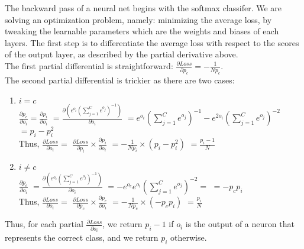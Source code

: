 The backward pass of a neural net begins with the softmax classifer.
We are solving an optimization problem, namely: minimizing the average loss,
by tweaking the learnable parameters which are the weights and biases of each layers.
The first step is to differentiate the average loss with respect to the scores of the output layer,
as described by the partial derivative above.\\
The first partial differential is straightforward: $\frac{\partial Loss}{\partial p_c} = -\frac{1}{Np_c}$.\\
The second partial differential is trickier as there are two cases:
\begin{enumerate}[topsep=-12pt]
  
 \item $i = c$\\
   $ \frac{\partial p_c}{\partial o_i} = \frac{\partial p_i}{\partial o_i} $
   $ = \frac{\partial( e^{o_i} (\sum_{j=1}^{C} e^{o_j})^{-1})} {\partial o_i} $
   $ = e^{o_i} (\sum_{j=1}^{C} e^{o_j})^{-1} - e^{2o_i} (\sum_{j=1}^{C} e^{o_j})^{-2} $
   $ = p_i - p_i^2$\\
   Thus, $\frac{\partial Loss}{\partial o_i} = $
   $ \frac{\partial Loss}{\partial p_i} \times \frac{\partial p_i}{\partial o_i} $
   $ =  -\frac{1}{Np_i} \times (p_i - p_i^2) $
   $ = \frac{p_i - 1}{N} $
   
 \item $i \neq c$\\
   $ \frac{\partial p_c}{\partial o_i} $
   $ = \frac{\partial( e^{o_c} (\sum_{j=1}^{C} e^{o_j})^{-1})} {\partial o_i} $
   $ = -e^{o_c}e^{o_i} (\sum_{j=1}^{C} e^{o_j})^{-2} = $
   $ = -p_cp_i $\\
   Thus, $\frac{\partial Loss}{\partial o_i} = $
   $ \frac{\partial Loss}{\partial p_c} \times \frac{\partial p_c}{\partial o_i} $
   $ =  -\frac{1}{Np_c} \times (-p_cp_i) $
   $ = \frac{p_i}{N} $ \\   
\end{enumerate}

Thus, for each partial $\frac {\partial Loss}{\partial o_i}$, we return $p_i - 1$ if $o_i$ is the output
of a neuron that represents the correct class, and we return $p_i$ otherwise.





